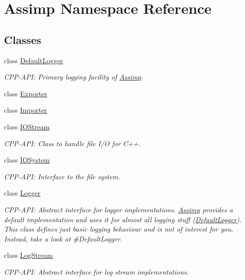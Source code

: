 \hypertarget{namespace_assimp}{}\section{Assimp Namespace Reference}
\label{namespace_assimp}
\subsection*{Classes}
\begin{DoxyCompactItemize}
\item 
class \hyperlink{class_assimp_1_1_default_logger}{Default\+Logger}
\begin{DoxyCompactList}\small\item\em C\+P\+P-\/\+A\+PI\+: Primary logging facility of \hyperlink{namespace_assimp}{Assimp}. \end{DoxyCompactList}\item 
class \hyperlink{class_assimp_1_1_exporter}{Exporter}
\item 
class \hyperlink{class_assimp_1_1_importer}{Importer}
\item 
class \hyperlink{class_assimp_1_1_i_o_stream}{I\+O\+Stream}
\begin{DoxyCompactList}\small\item\em C\+P\+P-\/\+A\+PI\+: Class to handle file I/O for C++. \end{DoxyCompactList}\item 
class \hyperlink{class_assimp_1_1_i_o_system}{I\+O\+System}
\begin{DoxyCompactList}\small\item\em C\+P\+P-\/\+A\+PI\+: Interface to the file system. \end{DoxyCompactList}\item 
class \hyperlink{class_assimp_1_1_logger}{Logger}
\begin{DoxyCompactList}\small\item\em C\+P\+P-\/\+A\+PI\+: Abstract interface for logger implementations. \hyperlink{namespace_assimp}{Assimp} provides a default implementation and uses it for almost all logging stuff (\textquotesingle{}\hyperlink{class_assimp_1_1_default_logger}{Default\+Logger}\textquotesingle{}). This class defines just basic logging behaviour and is not of interest for you. Instead, take a look at \#\+Default\+Logger. \end{DoxyCompactList}\item 
class \hyperlink{class_assimp_1_1_log_stream}{Log\+Stream}
\begin{DoxyCompactList}\small\item\em C\+P\+P-\/\+A\+PI\+: Abstract interface for log stream implementations. \end{DoxyCompactList}\item 

\end{DoxyCompactItemize}
